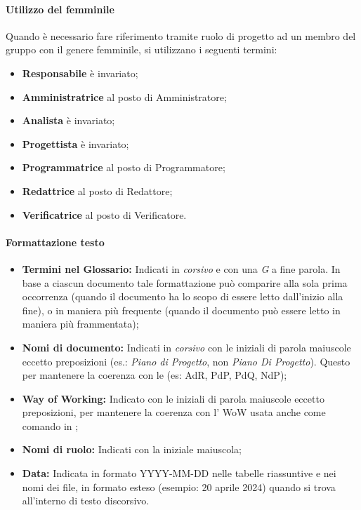 \paragraph{Utilizzo del femminile}
Quando è necessario fare riferimento tramite ruolo di progetto ad un membro del gruppo con il genere femminile, si utilizzano i seguenti termini:
\begin{itemize}
  \item \textbf{Responsabile} è invariato;
  \item \textbf{Amministratrice} al posto di Amministratore;
  \item \textbf{Analista} è invariato;
  \item \textbf{Progettista} è invariato;
  \item \textbf{Programmatrice} al posto di Programmatore;
  \item \textbf{Redattrice} al posto di Redattore;
  \item \textbf{Verificatrice} al posto di Verificatore.
\end{itemize}

\paragraph{Formattazione testo}
\begin{itemize}
  \item \textbf{Termini nel Glossario:} Indicati in \textit{corsivo} e con una \textit{\small{G}} a fine parola. In base a ciascun documento tale formattazione può comparire alla sola prima occorrenza (quando il documento ha lo scopo di essere letto dall'inizio alla fine), o in maniera più frequente (quando il documento può essere letto in maniera più frammentata);
  \item \textbf{Nomi di documento:} Indicati in \textit{corsivo} con le iniziali di parola maiuscole eccetto preposizioni (es.: \textit{Piano di Progetto}, non \textit{Piano Di Progetto}). Questo per mantenere la coerenza con le  (es: AdR, PdP, PdQ, NdP);
  \item \textbf{Way of Working:} Indicato con le iniziali di parola maiuscole eccetto preposizioni, per mantenere la coerenza con l' WoW usata anche come comando in ;
  \item \textbf{Nomi di ruolo:} Indicati con la iniziale maiuscola;
  \item \textbf{Data:} Indicata in formato YYYY-MM-DD nelle tabelle riassuntive e nei nomi dei file, in formato esteso (esempio: 20 aprile 2024) quando si trova all'interno di testo discorsivo.
\end{itemize}


